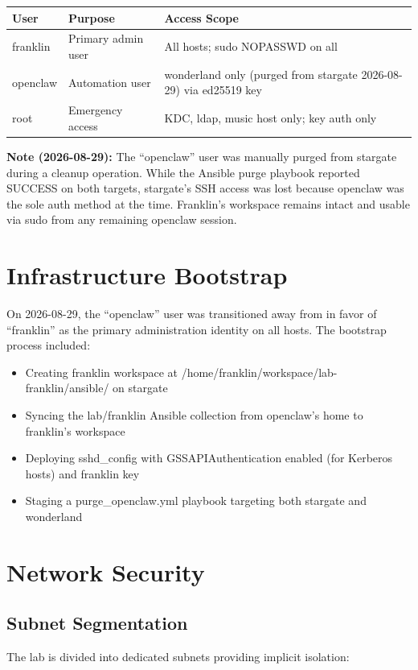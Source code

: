 \begin{center}
\begin{tabular}{lll}
  \hline
  \textbf{User} & \textbf{Purpose} & \textbf{Access Scope} \\ \hline
  franklin & Primary admin user & All hosts; sudo NOPASSWD on all \\
  openclaw & Automation user & wonderland only (purged from stargate 2026-08-29) via ed25519 key \\
  root & Emergency access & KDC, ldap, music host only; key auth only \\ \hline
\end{tabular}
\end{center}

\textbf{Note (2026-08-29):} The ``openclaw'' user was manually purged from stargate during a cleanup operation. While the Ansible purge playbook reported SUCCESS on both targets, stargate's SSH access was lost because openclaw was the sole auth method at the time. Franklin's workspace remains intact and usable via sudo from any remaining openclaw session.

\section{Infrastructure Bootstrap}

On 2026-08-29, the ``openclaw'' user was transitioned away from in favor of ``franklin'' as the primary administration identity on all hosts. The bootstrap process included:

\begin{itemize}
  \item Creating franklin workspace at /home/franklin/workspace/lab-franklin/ansible/ on stargate
  \item Syncing the lab/franklin Ansible collection from openclaw's home to franklin's workspace
  \item Deploying sshd\_config with GSSAPIAuthentication enabled (for Kerberos hosts) and franklin key
  \item Staging a purge\_openclaw.yml playbook targeting both stargate and wonderland
\end{itemize}

\section{Network Security}

\subsection{Subnet Segmentation}
The lab is divided into dedicated subnets providing implicit isolation:

